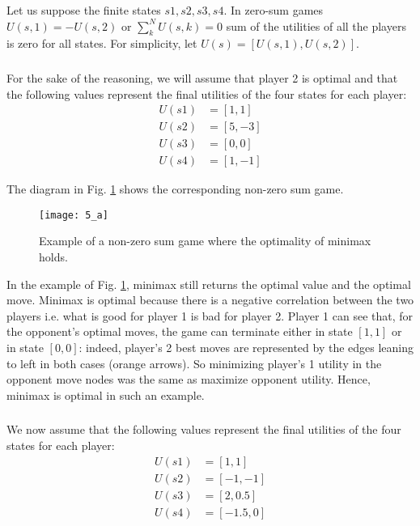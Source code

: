 Let us suppose the finite states $s1,s2,s3,s4$. In zero-sum games $U(s,1)=-U(s,2)$ or $\sum_{k}^{N}U(s,k)=0$ sum of the utilities of all the players is zero for all states. For simplicity, let $U(s)=[U(s,1),U(s,2)]$.


\subsubsection{}
For the sake of the reasoning, we will assume that player 2 is optimal and that the following values represent the final utilities of the four states for each player:
\begin{align*}
    U(s1)&=[1,1] \\
    U(s2)&=[5,-3] \\
    U(s3)&=[0,0] \\
    U(s4)&=[1,-1]
\end{align*}

The diagram in Fig. \ref{fig:5_a} shows the corresponding non-zero sum game.
\begin{figure}[h]
    \centering
    \texttt{[image: 5\_a]}
    \caption{Example of a non-zero sum game where the optimality of minimax holds.}
    \label{fig:5_a}
\end{figure}

In the example of Fig. \ref{fig:5_a}, minimax still returns the optimal value and the optimal move. Minimax is optimal because there is a negative correlation between the two players i.e. what is good for player 1 is bad for player 2. Player 1 can see that, for the opponent's optimal moves, the game can terminate either in state $[1,1]$ or in state $[0,0]$: indeed, player's 2 best moves are represented by the edges leaning to left in both cases (orange arrows). So minimizing player's 1 utility in the opponent move nodes was the same as maximize opponent utility. Hence, minimax is optimal in such an example.

\subsubsection{}
We now assume that the following values represent the final utilities of the four states for each player:
\begin{align*}
    U(s1)&=[1,1] \\
    U(s2)&=[-1,-1] \\
    U(s3)&=[2,0.5] \\
    U(s4)&=[-1.5,0]
\end{align*}

